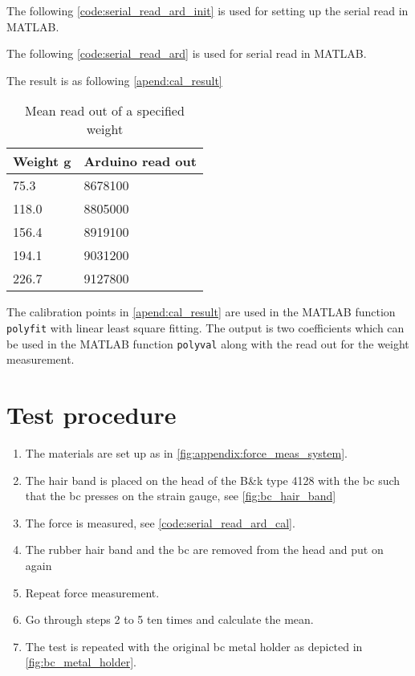 The following \autoref{code:serial_read_ard_init} is used for setting up the serial read in MATLAB.


The following \autoref{code:serial_read_ard} is used for serial read in MATLAB.


The result is as following \autoref{apend:cal_result}

\begin{table}[H]
\centering
\caption{Mean read out of a specified weight}
\label{apend:cal_result}
\begin{tabular}{l|l}
Weight \si{\gram} & Arduino read out \\ \hline
75.3              & 8678100          \\
118.0             & 8805000          \\
156.4             & 8919100          \\
194.1             & 9031200          \\
226.7             & 9127800         
\end{tabular}
\end{table}

The calibration points in \autoref{apend:cal_result} are used in the MATLAB function \texttt{polyfit} with linear least square fitting. The output is two coefficients which can be used in the MATLAB function \texttt{polyval} along with the read out for the weight measurement. 


\section*{Test procedure}


\begin{enumerate}
\item The materials are set up as in \autoref{fig:appendix:force_meas_system}.
\item The hair band is placed on the head of the B\&k type 4128 with the \gls{bc} such that the \gls{bc} presses on the strain gauge, see \autoref{fig:bc_hair_band}
\item The force is measured, see \autoref{code:serial_read_ard_cal}.
\item The rubber hair band and the \gls{bc} are removed from the head and put on again
\item Repeat force measurement.
\item  Go through steps 2 to 5 ten times and calculate the mean.
\item  The test is repeated with the original \gls{bc} metal holder as depicted in \autoref{fig:bc_metal_holder}.
\end{enumerate}



